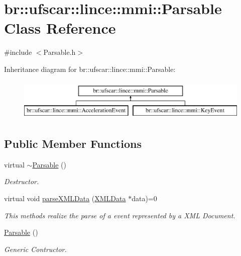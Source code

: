 \hypertarget{classbr_1_1ufscar_1_1lince_1_1mmi_1_1Parsable}{
\section{br::ufscar::lince::mmi::Parsable Class Reference}
\label{classbr_1_1ufscar_1_1lince_1_1mmi_1_1Parsable}
}


{\ttfamily \#include $<$Parsable.h$>$}

Inheritance diagram for br::ufscar::lince::mmi::Parsable:\begin{figure}[H]
\begin{center}
\leavevmode
\includegraphics[height=2cm]{classbr_1_1ufscar_1_1lince_1_1mmi_1_1Parsable}
\end{center}
\end{figure}
\subsection*{Public Member Functions}
\begin{DoxyCompactItemize}
\item 
virtual \hyperlink{classbr_1_1ufscar_1_1lince_1_1mmi_1_1Parsable_ab2537805eb3b5fd91436a72edd4a3805}{$\sim$Parsable} ()
\begin{DoxyCompactList}\small\item\em Destructor. \item\end{DoxyCompactList}\item 
virtual void \hyperlink{classbr_1_1ufscar_1_1lince_1_1mmi_1_1Parsable_a6524a0a77abb3865e5d255e466b6159e}{parseXMLData} (\hyperlink{structbr_1_1ufscar_1_1lince_1_1mmi_1_1XMLData}{XMLData} $\ast$data)=0
\begin{DoxyCompactList}\small\item\em This methods realize the parse of a event represented by a XML Document. \item\end{DoxyCompactList}\item 
\hyperlink{classbr_1_1ufscar_1_1lince_1_1mmi_1_1Parsable_ade12a0d0cab87281461cca1c4bee7afd}{Parsable} ()
\begin{DoxyCompactList}\small\item\em Generic Contructor. \item\end{DoxyCompactList}\end{DoxyCompactItemize}


